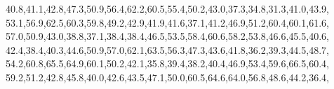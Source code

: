 \documentclass[
]{book}
\newenvironment{Shaded}{\begin{snugshade}}{\end{snugshade}}
\newcommand{\FloatTok}[1]{\textcolor[rgb]{0.00,0.00,0.81}{#1}}
\newcommand{\NormalTok}[1]{#1}
\begin{document}
\begin{Shaded}
\begin{Highlighting}[]
          \FloatTok{40.8}\NormalTok{,}\FloatTok{41.1}\NormalTok{,}\FloatTok{42.8}\NormalTok{,}\FloatTok{47.3}\NormalTok{,}\FloatTok{50.9}\NormalTok{,}\FloatTok{56.4}\NormalTok{,}\FloatTok{62.2}\NormalTok{,}\FloatTok{60.5}\NormalTok{,}\FloatTok{55.4}\NormalTok{,}\FloatTok{50.2}\NormalTok{,}\FloatTok{43.0}\NormalTok{,}\FloatTok{37.3}\NormalTok{,}\FloatTok{34.8}\NormalTok{,}\FloatTok{31.3}\NormalTok{,}\FloatTok{41.0}\NormalTok{,}\FloatTok{43.9}\NormalTok{,}
          \FloatTok{53.1}\NormalTok{,}\FloatTok{56.9}\NormalTok{,}\FloatTok{62.5}\NormalTok{,}\FloatTok{60.3}\NormalTok{,}\FloatTok{59.8}\NormalTok{,}\FloatTok{49.2}\NormalTok{,}\FloatTok{42.9}\NormalTok{,}\FloatTok{41.9}\NormalTok{,}\FloatTok{41.6}\NormalTok{,}\FloatTok{37.1}\NormalTok{,}\FloatTok{41.2}\NormalTok{,}\FloatTok{46.9}\NormalTok{,}\FloatTok{51.2}\NormalTok{,}\FloatTok{60.4}\NormalTok{,}\FloatTok{60.1}\NormalTok{,}\FloatTok{61.6}\NormalTok{,}
          \FloatTok{57.0}\NormalTok{,}\FloatTok{50.9}\NormalTok{,}\FloatTok{43.0}\NormalTok{,}\FloatTok{38.8}\NormalTok{,}\FloatTok{37.1}\NormalTok{,}\FloatTok{38.4}\NormalTok{,}\FloatTok{38.4}\NormalTok{,}\FloatTok{46.5}\NormalTok{,}\FloatTok{53.5}\NormalTok{,}\FloatTok{58.4}\NormalTok{,}\FloatTok{60.6}\NormalTok{,}\FloatTok{58.2}\NormalTok{,}\FloatTok{53.8}\NormalTok{,}\FloatTok{46.6}\NormalTok{,}\FloatTok{45.5}\NormalTok{,}\FloatTok{40.6}\NormalTok{,}
          \FloatTok{42.4}\NormalTok{,}\FloatTok{38.4}\NormalTok{,}\FloatTok{40.3}\NormalTok{,}\FloatTok{44.6}\NormalTok{,}\FloatTok{50.9}\NormalTok{,}\FloatTok{57.0}\NormalTok{,}\FloatTok{62.1}\NormalTok{,}\FloatTok{63.5}\NormalTok{,}\FloatTok{56.3}\NormalTok{,}\FloatTok{47.3}\NormalTok{,}\FloatTok{43.6}\NormalTok{,}\FloatTok{41.8}\NormalTok{,}\FloatTok{36.2}\NormalTok{,}\FloatTok{39.3}\NormalTok{,}\FloatTok{44.5}\NormalTok{,}\FloatTok{48.7}\NormalTok{,}
          \FloatTok{54.2}\NormalTok{,}\FloatTok{60.8}\NormalTok{,}\FloatTok{65.5}\NormalTok{,}\FloatTok{64.9}\NormalTok{,}\FloatTok{60.1}\NormalTok{,}\FloatTok{50.2}\NormalTok{,}\FloatTok{42.1}\NormalTok{,}\FloatTok{35.8}\NormalTok{,}\FloatTok{39.4}\NormalTok{,}\FloatTok{38.2}\NormalTok{,}\FloatTok{40.4}\NormalTok{,}\FloatTok{46.9}\NormalTok{,}\FloatTok{53.4}\NormalTok{,}\FloatTok{59.6}\NormalTok{,}\FloatTok{66.5}\NormalTok{,}\FloatTok{60.4}\NormalTok{,}
          \FloatTok{59.2}\NormalTok{,}\FloatTok{51.2}\NormalTok{,}\FloatTok{42.8}\NormalTok{,}\FloatTok{45.8}\NormalTok{,}\FloatTok{40.0}\NormalTok{,}\FloatTok{42.6}\NormalTok{,}\FloatTok{43.5}\NormalTok{,}\FloatTok{47.1}\NormalTok{,}\FloatTok{50.0}\NormalTok{,}\FloatTok{60.5}\NormalTok{,}\FloatTok{64.6}\NormalTok{,}\FloatTok{64.0}\NormalTok{,}\FloatTok{56.8}\NormalTok{,}\FloatTok{48.6}\NormalTok{,}\FloatTok{44.2}\NormalTok{,}\FloatTok{36.4}\NormalTok{,}

\end{Highlighting}
\end{Shaded}
\end{document}
